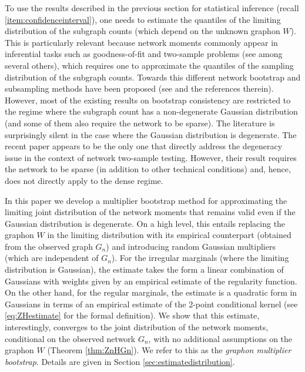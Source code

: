 \documentclass[11pt,reqno]{amsart}
\numberwithin{equation}{section}
\theoremstyle{definition}
\begin{document}
To use the results described in the previous section for statistical inference (recall \ref{item:confidenceinterval}), one needs to estimate the quantiles of the limiting distribution of the subgraph counts (which depend on the unknown graphon $W$). This is particularly relevant because network moments commonly appear in inferential tasks such as goodness-of-fit and two-sample problems (see \cite{ghoshdastidar2017networkstatistics,levin2019bootstrapping,shao2022higher,lei2016,tang2017nonparametric,ouadah2022motif,bravo2023quantifying,maugis2017statistical,wegner2018identifying} among several others), which requires one to approximate the quantiles of the sampling distribution of the subgraph counts. Towards this different network bootstrap and subsampling methods have been proposed (see \cite{subsamplingnetwork,levin2019bootstrapping,lin2020bootstrap,lunde2023subsampling,green2022bootstrapping,zhang2022edgeworth} and the references therein). However, most of the  existing results on bootstrap consistency are restricted to the regime where the subgraph count has a non-degenerate Gaussian distribution (and some of them also require the network to be sparse). The literature is surprisingly silent in the case where the Gaussian distribution is degenerate. The recent paper \cite{shao2022higher} appears to be the only one that directly address the degeneracy issue in the context of network two-sample testing. However, their result requires the network to be sparse (in addition to other technical conditions) and, hence, does not directly apply to the dense regime. 


In this paper we develop a multiplier bootstrap method for approximating the limiting joint distribution of the network moments that remains valid even if the Gaussian distribution is degenerate. On a high level, this entails replacing the graphon $W$ in the limiting distribution with its empirical counterpart (obtained from the observed graph $G_n$) and introducing random Gaussian multipliers (which are independent of $G_n$). For the irregular marginals (where the limiting distribution is Gaussian), the estimate takes the form a linear combination of Gaussians with weights given by an empirical estimate of the regularity function. On the other hand, for the regular marginals, the estimate is a quadratic form in Gaussians in terms of an empirical estimate of the 2-point conditional kernel (see \eqref{eq:ZHestimate} for the formal definition). We show that this estimate, interestingly, converges to the joint distribution of the network moments, conditional on the observed network $G_n$, with no additional assumptions on the graphon $W$ (Theorem \ref{thm:ZnHGn}). We refer to this as the {\it graphon multiplier bootstrap}. Details are given in Section \ref{sec:estimatedistribution}. 
\end{document}
